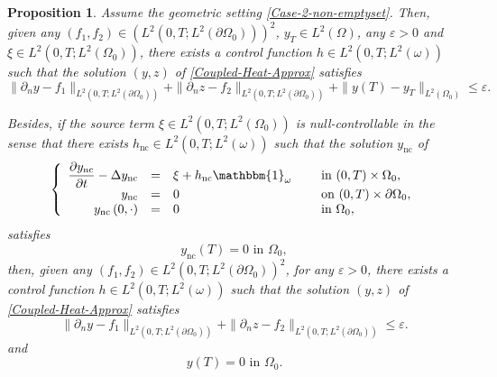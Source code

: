 \documentclass[10pt,a4paper]{amsart}
\newcommand{\nc}{\mathrm{nc}}
\newtheorem{proposition}[theorem]{Proposition}
\theoremstyle{definition}
\begin{document}
\begin{proposition}
\label{Prop-Approx-Cont-Case2}
Assume the geometric setting \eqref{Case-2-non-emptyset}. Then, given any $(f_1, f_2) \in (L^2(0,T; L^2(\partial \Omega_0)))^2$, $y_T \in L^2(\Omega)$, any $\varepsilon >0$ and $\xi \in L^2(0,T; L^2(\Omega_0))$, there exists a control function $h \in L^2(0,T; L^2(\omega))$ such that the solution $(y,z)$ of \eqref{Coupled-Heat-Approx} satisfies
\begin{equation}
\label{Approx-Cont-Case2}
\| \partial_n y - f_1 \|_{L^2(0,T; L^2(\partial\Omega_0))}
+
\| \partial_n z - f_2 \|_{L^2(0,T; L^2(\partial\Omega_0))}
+
\| y(T) - y_T \|_{L^2(\Omega_0)}
\leq
\varepsilon.
\end{equation}

Besides, if {the source term} $\xi \in L^2(0,T; L^2(\Omega_0))$ is null-controllable in the sense that there exists $h_{\nc} \in L^2(0,T; L^2(\omega))$ such that the solution $y_{\nc}$ of
\begin{equation}
\label{y-nc}
\left\{
\begin{array}{rcll}
\dfrac{\partial y_{\nc}}{\partial t}-\Delta y_{\nc} &=&\xi +h_{\nc} \mathbbm{1}_{\omega}\quad&\text{ in }(0,T) \times \Omega_0,
\\
y_{\nc} &=& 0 &\text{ on }(0,T) \times \partial \Omega_0,
\\
y_{\nc}\left(0,\cdot\right) &=& 0 &\text{ in }\Omega_0,
\end{array}
\right.
\end{equation}
satisfies
\begin{equation}
\label{NC-Assumption}
y_{\nc}(T) = 0 \text{ in } \Omega_0,
\end{equation}
then, given any $(f_1, f_2) \in L^2(0,T; L^2(\partial \Omega_0))^2$, for any $\varepsilon >0$, there exists a control function $h \in L^2(0,T; L^2(\omega))$ such that the solution $(y,z)$ of \eqref{Coupled-Heat-Approx} satisfies
\begin{equation}
\label{Approx-Cont-2}
\| \partial_n y - f_1 \|_{L^2(0,T; L^2(\partial\Omega_0))}
+
\| \partial_n z - f_2 \|_{L^2(0,T; L^2(\partial\Omega_0))}
\leq
\varepsilon.
\end{equation}
and
\begin{equation}
\label{NullControl}
y(T) = 0 \text{ in } \Omega_0.
\end{equation}
\end{proposition}
\end{document}
